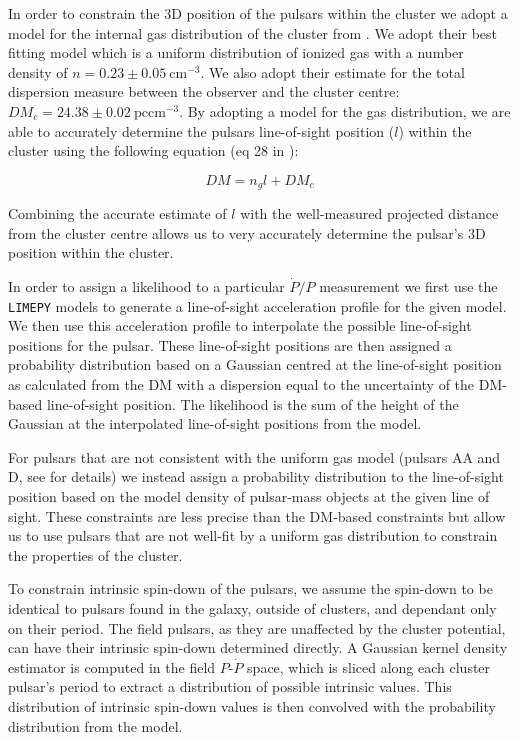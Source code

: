 In order to constrain the 3D position of the pulsars within the cluster we adopt a model for the
internal gas distribution of the cluster from \citet{Abbate2018}. We adopt their best fitting model
which is a uniform distribution of ionized gas with a number density of $n = 0.23 \pm 0.05 \
    \text{cm}^{-3}$. We also adopt their estimate for the total dispersion measure between the observer
and the cluster centre: $DM_c = 24.38 \pm 0.02 \ \mathrm{pc cm}^{-3}$. By adopting a model for the
gas distribution, we are able to accurately determine the pulsars line-of-sight position ($l$)
within the cluster using the following equation (eq 28 in \citet{Abbate2018}):

\begin{equation}
    DM = n_g l + DM_c
    \label{eq:DM-los}
\end{equation}

Combining the accurate estimate of $l$ with the well-measured projected distance from the cluster
centre allows us to very accurately determine the pulsar's 3D position within the cluster.

In order to assign a likelihood to a particular $\dot{P}/P$ measurement we first use the
\texttt{LIMEPY} models to generate a line-of-sight acceleration profile for the given model. We then
use this acceleration profile to interpolate the possible line-of-sight positions for the pulsar.
These line-of-sight positions are then assigned a probability distribution based on a Gaussian
centred at the line-of-sight position as calculated from the DM with a dispersion equal to the
uncertainty of the DM-based line-of-sight position. The likelihood is the sum of the height of the
Gaussian at the interpolated line-of-sight positions from the model.


For pulsars that are not consistent with the uniform gas model (pulsars AA and D, see
\citealt{Abbate2018} for details) we instead assign a probability distribution to the line-of-sight
position based on the model density of pulsar-mass objects at the given line of sight. These
constraints are less precise than the DM-based constraints but allow us to use pulsars that are not
well-fit by a uniform gas distribution to constrain the properties of the cluster.

To constrain intrinsic spin-down of the pulsars, we assume the spin-down to be identical to pulsars
found in the galaxy, outside of clusters, and dependant only on their period. The field pulsars, as
they are unaffected by the cluster potential, can have their intrinsic spin-down determined
directly. A Gaussian kernel density estimator is computed in the field $P$-$\dot{P}$ space, which is
sliced along each cluster pulsar's period to extract a distribution of possible intrinsic values.
This distribution of intrinsic spin-down values is then convolved with the probability distribution
from the model.

